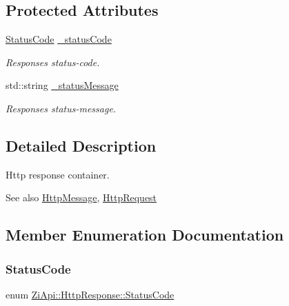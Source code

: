 \subsection*{Protected Attributes}
\begin{DoxyCompactItemize}
\item 
\mbox{\label{classZiApi_1_1HttpResponse_a0e4b24ee46576f8603a1d148ee5243c0}} 
\mbox{\hyperlink{classZiApi_1_1HttpResponse_aa304ae6c6c8d12f651eafc75fb203d90}{Status\+Code}} \mbox{\hyperlink{classZiApi_1_1HttpResponse_a0e4b24ee46576f8603a1d148ee5243c0}{\+\_\+status\+Code}}
\begin{DoxyCompactList}\small\item\em Response\textquotesingle{}s status-\/code. \end{DoxyCompactList}\item 
\mbox{\label{classZiApi_1_1HttpResponse_ada43f4f8e721527cca4082bf0a6a3f40}} 
std\+::string \mbox{\hyperlink{classZiApi_1_1HttpResponse_ada43f4f8e721527cca4082bf0a6a3f40}{\+\_\+status\+Message}}
\begin{DoxyCompactList}\small\item\em Response\textquotesingle{}s status-\/message. \end{DoxyCompactList}\end{DoxyCompactItemize}


\subsection{Detailed Description}
Http response container. 

\begin{DoxySeeAlso}{See also}
\mbox{\hyperlink{classZiApi_1_1HttpMessage}{Http\+Message}}, \mbox{\hyperlink{classZiApi_1_1HttpRequest}{Http\+Request}} 
\end{DoxySeeAlso}


\subsection{Member Enumeration Documentation}
\mbox{\label{classZiApi_1_1HttpResponse_aa304ae6c6c8d12f651eafc75fb203d90}} 
\subsubsection{\texorpdfstring{StatusCode}{StatusCode}}
{\footnotesize\ttfamily enum \mbox{\hyperlink{classZiApi_1_1HttpResponse_aa304ae6c6c8d12f651eafc75fb203d90}{Zi\+Api\+::\+Http\+Response\+::\+Status\+Code}}\hspace{0.3cm}{\ttfamily [strong]}}

